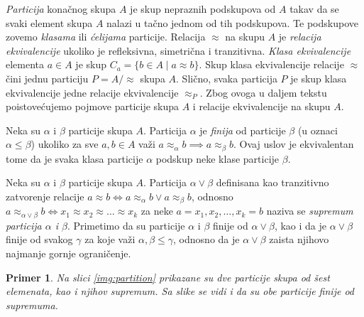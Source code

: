\documentclass[12pt,oneside]{memoir}
\newtheorem{example}{Primer}
\theoremstyle{definition}
\begin{document}
   \emph{Particija} konačnog skupa $A$ je skup nepraznih podskupova od $A$
   takav da se svaki element skupa $A$ nalazi u tačno jednom od tih podskupova.
   Te podskupove zovemo \emph{klasama} ili \emph{ćelijama} particije. Relacija
   $\approx$ na skupu $A$ je \emph{relacija ekvivalencije} ukoliko je
   refleksivna, simetrična i tranzitivna. \emph{Klasa ekvivalencije} elementa
   $a \in A$ je skup $C_a = \{b \in A \mid a \approx b\}$. Skup klasa
   ekvivalencije relacije $\approx$ čini jednu particiju $P = A/{\approx}$ skupa
   $A$. Slično, svaka particija $P$ je skup klasa ekvivalencije jedne relacije
   ekvivalencije $\approx_P$. Zbog ovoga u daljem tekstu poistovećujemo pojmove
   particije skupa $A$ i relacije ekvivalencije na skupu $A$.

   Neka su $\alpha$ i $\beta$ particije skupa $A$. Particija $\alpha$
   je \emph{finija} od particije $\beta$ (u oznaci ${\alpha} \leq {\beta}$)
   ukoliko za sve $a, b \in A$ važi $a \approx_\alpha b \implies a \approx_\beta b$.
   Ovaj uslov je ekvivalentan tome da je svaka klasa particije $\alpha$
   podskup neke klase particije $\beta$.

   Neka su $\alpha$ i $\beta$ particije skupa $A$. Particija $\alpha \lor
   \beta$ definisana kao tranzitivno zatvorenje relacije $a \approx b \iff a
   \approx_\alpha b \lor a \approx_\beta b$, odnosno $a \approx_{\alpha \lor
   \beta} b \iff x_1 \approx x_2 \approx \dots \approx x_k$ za neke $a = x_1,
   x_2, \dots, x_k = b$ naziva se \emph{supremum particija $\alpha$ i $\beta$}.
   Primetimo da su particije $\alpha$ i $\beta$ finije od $\alpha \lor \beta$,
   kao i da je $\alpha \lor \beta$ finije od svakog $\gamma$ za koje važi
   $\alpha, \beta \leq \gamma$, odnosno da je $\alpha \lor \beta$ zaista
   njihovo najmanje gornje ograničenje.

   \begin{example}
	   Na slici \ref{img:partition} prikazane su dve particije skupa od šest
	   elemenata, kao i njihov supremum. Sa slike se vidi i da su obe particije
	   finije od supremuma.
   \end{example}
\end{document}
